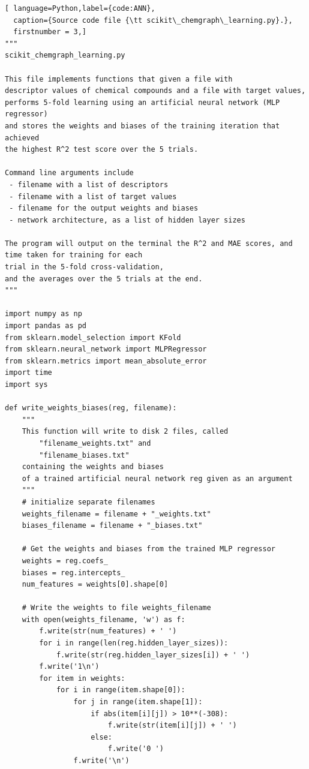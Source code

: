 \documentclass[11pt,titlepage,dvipdfmx,twoside]{article}
\begin{document}
\begin{lstlisting}[ language=Python,label={code:ANN},
  caption={Source code file {\tt scikit\_chemgraph\_learning.py}.},
  firstnumber = 3,]
"""
scikit_chemgraph_learning.py

This file implements functions that given a file with
descriptor values of chemical compounds and a file with target values,
performs 5-fold learning using an artificial neural network (MLP regressor)
and stores the weights and biases of the training iteration that achieved
the highest R^2 test score over the 5 trials. 

Command line arguments include
 - filename with a list of descriptors
 - filename with a list of target values
 - filename for the output weights and biases
 - network architecture, as a list of hidden layer sizes
 
The program will output on the terminal the R^2 and MAE scores, and
time taken for training for each 
trial in the 5-fold cross-validation, 
and the averages over the 5 trials at the end.
"""

import numpy as np
import pandas as pd
from sklearn.model_selection import KFold
from sklearn.neural_network import MLPRegressor
from sklearn.metrics import mean_absolute_error
import time
import sys

def write_weights_biases(reg, filename):
    """ 
    This function will write to disk 2 files, called
        "filename_weights.txt" and
        "filename_biases.txt"
    containing the weights and biases 
    of a trained artificial neural network reg given as an argument
    """
    # initialize separate filenames
    weights_filename = filename + "_weights.txt"
    biases_filename = filename + "_biases.txt"
    
    # Get the weights and biases from the trained MLP regressor
    weights = reg.coefs_
    biases = reg.intercepts_
    num_features = weights[0].shape[0]
    
    # Write the weights to file weights_filename
    with open(weights_filename, 'w') as f:
        f.write(str(num_features) + ' ')
        for i in range(len(reg.hidden_layer_sizes)):
            f.write(str(reg.hidden_layer_sizes[i]) + ' ')
        f.write('1\n')
        for item in weights:
            for i in range(item.shape[0]):
                for j in range(item.shape[1]):
                    if abs(item[i][j]) > 10**(-308):
                        f.write(str(item[i][j]) + ' ')
                    else:
                        f.write('0 ')
                f.write('\n')
    

\end{lstlisting}
\end{document}
